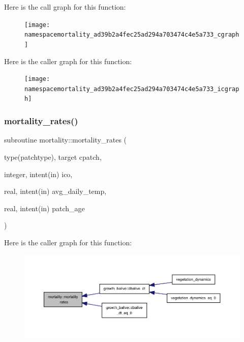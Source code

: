 Here is the call graph for this function\+:
\nopagebreak
\begin{figure}[H]
\begin{center}
\leavevmode
\texttt{[image: namespacemortality\_ad39b2a4fec25ad294a703474c4e5a733\_cgraph]}
\end{center}
\end{figure}
Here is the caller graph for this function\+:
\nopagebreak
\begin{figure}[H]
\begin{center}
\leavevmode
\texttt{[image: namespacemortality\_ad39b2a4fec25ad294a703474c4e5a733\_icgraph]}
\end{center}
\end{figure}
\mbox{\label{namespacemortality_af7ebabdd3dd650224f2a5ddfac2f888e}} 
\subsubsection{\texorpdfstring{mortality\+\_\+rates()}{mortality\_rates()}}
{\footnotesize\ttfamily subroutine mortality\+::mortality\+\_\+rates (\begin{DoxyParamCaption}\item[{type(patchtype), target}]{cpatch,  }\item[{integer, intent(in)}]{ico,  }\item[{real, intent(in)}]{avg\+\_\+daily\+\_\+temp,  }\item[{real, intent(in)}]{patch\+\_\+age }\end{DoxyParamCaption})}

Here is the caller graph for this function\+:
\nopagebreak
\begin{figure}[H]
\begin{center}
\leavevmode
\includegraphics[width=350pt]{namespacemortality_af7ebabdd3dd650224f2a5ddfac2f888e_icgraph}
\end{center}
\end{figure}
\mbox{\label{namespacemortality_aae8b4072e1f5c7c59cc76370de99d271}} 
